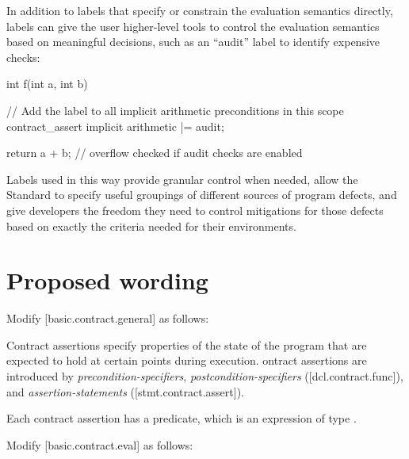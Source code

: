 In addition to labels that specify or constrain the evaluation semantics directly, labels can give the user higher-level tools to control the evaluation semantics based on meaningful decisions, such as an ``audit'' label to identify expensive checks:

\begin{codeblock}
int f(int a, int b)
{
    // Add the  label to all implicit arithmetic preconditions in this scope
    contract_assert implicit arithmetic |= audit;

    return a + b;  // overflow checked if audit checks are enabled
}
\end{codeblock}

Labels used in this way provide granular control when needed, allow the Standard to
specify useful groupings of different sources of program defects, and give developers the freedom they
need to control mitigations for those defects based on exactly the criteria needed for their environments.

\section{Proposed wording}
\label{wording}

Modify [basic.contract.general] as follows:

\begin{adjustwidth}{0.5cm}{0.5cm}
Contract assertions specify properties of the state of the program
that are expected to hold at certain points during execution. ontract assertions
are introduced by \emph{precondition-specifiers}, \emph{postcondition-specifiers} ([dcl.contract.func]),
and \emph{assertion-statements} ([stmt.contract.assert]). 

Each contract assertion has a predicate, which is an expression of type . 
\begin{note}
\end{note}
\end{adjustwidth}

Modify [basic.contract.eval] as follows:

